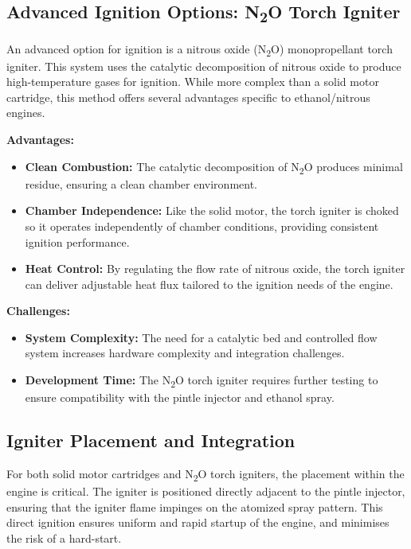 \subsection{Advanced Ignition Options: N\textsubscript{2}O Torch Igniter}

An advanced option for ignition is a nitrous oxide (N\textsubscript{2}O) monopropellant torch igniter. This system uses the catalytic decomposition of nitrous oxide to produce high-temperature gases for ignition. While more complex than a solid motor cartridge, this method offers several advantages specific to ethanol/nitrous engines.

\textbf{Advantages:}
\begin{itemize}
    \item \textbf{Clean Combustion:} The catalytic decomposition of N\textsubscript{2}O produces minimal residue, ensuring a clean chamber environment.
    \item \textbf{Chamber Independence:} Like the solid motor, the torch igniter is choked so it operates independently of chamber conditions, providing consistent ignition performance.
    \item \textbf{Heat Control:} By regulating the flow rate of nitrous oxide, the torch igniter can deliver adjustable heat flux tailored to the ignition needs of the engine.
\end{itemize}

\textbf{Challenges:}
\begin{itemize}
    \item \textbf{System Complexity:} The need for a catalytic bed and controlled flow system increases hardware complexity and integration challenges.
    \item \textbf{Development Time:} The N\textsubscript{2}O torch igniter requires further testing to ensure compatibility with the pintle injector and ethanol spray.
\end{itemize}

\subsection{Igniter Placement and Integration}

For both solid motor cartridges and N\textsubscript{2}O torch igniters, the placement within the engine is critical. The igniter is positioned directly adjacent to the pintle injector, ensuring that the igniter flame impinges on the atomized spray pattern. This direct ignition ensures uniform and rapid startup of the engine, and minimises the risk of a hard-start.

